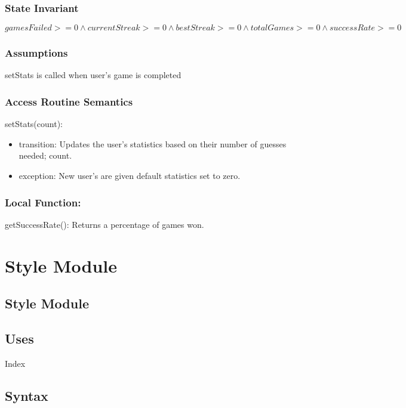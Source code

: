 \documentclass[12pt]{article}
\begin{document}
\subsubsection* {State Invariant}

$gamesFailed >= 0 \wedge currentStreak >= 0 \wedge bestStreak >= 0 \wedge totalGames >= 0 \wedge successRate >= 0  $

\subsubsection* {Assumptions}

setStats is called when user's game is completed

\subsubsection* {Access Routine Semantics}

\noindent setStats(count):
\begin{itemize}
  \item transition: Updates the user's statistics based on their number of guesses needed; count.
  \item exception: New user's are given default statistics set to zero.
\end{itemize}

\subsubsection*{Local Function:}

getSuccessRate(): Returns a percentage of games won.


\newpage

\section {Style Module}

\subsection* {Style Module}

\subsection* {Uses}

Index

\subsection* {Syntax}
\end{document}
